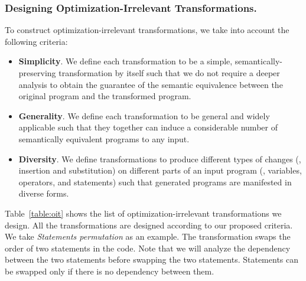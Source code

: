 \begin{table}
{\begin{tabular}{ | c | c | c | }
\begin{minipage}[m]{0.75\textwidth}
			\lstset{style=mystyle, numbers = none, xleftmargin=0.5em,frame=none}
			

		\end{minipage}
		\\
		\hline
	\end{tabular}}
	\label{table:transforms}
\end{table}

\subsubsection{Designing Optimization-Irrelevant Transformations.}
 
To construct optimization-irrelevant transformations,  we take into account the following criteria:
\begin{itemize}[leftmargin=*]
	\item \textbf{Simplicity}. We define each transformation to be a simple, semantically-preserving transformation by itself such that we do not require a deeper analysis to obtain the guarantee of the semantic equivalence between the original program and the transformed program.
	\item \textbf{Generality}. We define each transformation to be general and widely applicable such that they together can induce a considerable number of semantically equivalent programs to any input.	
	\item \textbf{Diversity}.  We define transformations to produce different types of changes (\eg, insertion and substitution) on different parts of an input program (\eg, variables, operators, and statements) such that generated programs are manifested in diverse forms.
\end{itemize}
Table~\ref{table:oit} shows the list of optimization-irrelevant transformations we design. All the transformations are designed according to our proposed criteria. 
We take \textit{Statements permutation} as an example. The transformation swaps the order of two statements in the code. Note that we will analyze the dependency between the two statements before swapping the two statements. Statements can be swapped only if there is no dependency between them.


